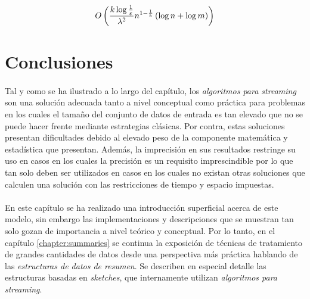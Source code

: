 \documentclass{subfiles}
\begin{document}
      \begin{equation}
      \label{eq:complexity_frecuency_moments}
        {\displaystyle O\left({\dfrac {k\log {1 \over \varepsilon }}{\lambda ^{2}}}n^{1-{1 \over k}}\left(\log n+\log m\right)\right)}
      \end{equation}


  \section{Conclusiones}
  \label{sec:streaming_conclusions}

    \paragraph{}
    Tal y como se ha ilustrado a lo largo del capítulo, los \emph{algoritmos para streaming} son una solución adecuada tanto a nivel conceptual como práctica para problemas en los cuales el tamaño del conjunto de datos de entrada es tan elevado que no se puede hacer frente mediante estrategias clásicas. Por contra, estas soluciones presentan dificultades debido al elevado peso de la componente matemática y estadística que presentan. Además, la imprecisión en sus resultados restringe su uso en casos en los cuales la precisión es un requisito imprescindible por lo que tan solo deben ser utilizados en casos en los cuales no existan otras soluciones que calculen una solución con las restricciones de tiempo y espacio impuestas.

    \paragraph{}
    En este capítulo se ha realizado una introducción superficial acerca de este modelo, sin embargo las implementaciones y descripciones que se muestran tan solo gozan de importancia a nivel teórico y conceptual. Por lo tanto, en el capítulo \ref{chapter:summaries} se continua la exposición de técnicas de tratamiento de grandes cantidades de datos desde una perspectiva más práctica hablando de las \emph{estructuras de datos de resumen}. Se describen en especial detalle las estructuras basadas en \emph{sketches}, que internamente utilizan \emph{algoritmos para streaming}.
\end{document}
